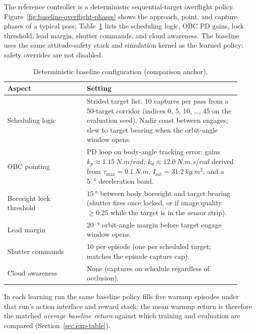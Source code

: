 The reference controller is a deterministic sequential-target overflight policy.
Figure~\ref{fig:baseline-overflight-phases} shows the approach, point, and capture phases of a typical pass; Table~\ref{tab:baseline-config} lists the scheduling logic, OBC PD gains, lock threshold, lead margin, shutter commands, and cloud awareness.
The baseline uses the same attitude-safety stack and simulation kernel as the learned policy: safety overrides are not disabled.

\begin{table}[htbp]
  \centering
  \renewcommand{\arraystretch}{1.3}
  \caption{Deterministic baseline configuration (comparison anchor).}
  \label{tab:baseline-config}
  \small
  \begin{tabular}{p{0.32\linewidth}p{0.62\linewidth}}
    \toprule
    Aspect & Setting \\
    \midrule
    Scheduling logic &
      Strided target list: 10 captures per pass from a 50-target corridor (indices 0, 5, 10, \ldots, 45 on the evaluation seed).
      Nadir coast between engages; slew to target bearing when the orbit-angle window opens. \\
    OBC pointing &
      PD loop on body-angle tracking error; gains $k_p \approx \SI{1.15}{N.m/rad}$, $k_d \approx \SI{12.0}{N.m.s/rad}$
      derived from $\tau_\text{max}=\SI{0.1}{N.m}$, $I_\text{sat}=\SI{31.2}{kg.m^2}$, and a \SI{5}{\degree} deceleration band. \\
    Boresight lock threshold &
      $\SI{15}{\degree}$ between body boresight and target bearing (shutter fires once locked, or if image quality $\ge 0.25$ while the target is in the sensor strip). \\
    Lead margin &
      \SI{20}{\degree} orbit-angle margin before target engage window opens. \\
    Shutter commands &
      10 per episode (one per scheduled target; matches the episode capture cap). \\
    Cloud awareness &
      None (captures on schedule regardless of occlusion). \\
    \bottomrule
  \end{tabular}
\end{table}

In each learning run the same baseline policy fills five warmup episodes under that run's action interface and reward stack;
the mean warmup return is therefore the matched \emph{average baseline return} against which training and evaluation are compared (Section~\ref{sec:exp-table}).

